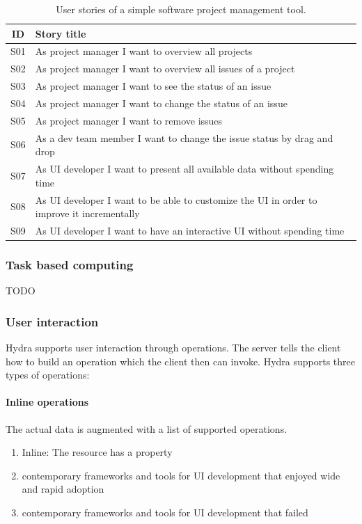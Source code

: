 \begin{table}
  \begin{center}
    \begin{tabular}{ |c|l| }
      \hline
      ID & Story title \\
      \hline
      S01 & As project manager I want to overview all projects \\
      S02 & As project manager I want to overview all issues of a project \\
      S03 & As project manager I want to see the status of an issue \\
      S04 & As project manager I want to change the status of an issue \\
      S05 & As project manager I want to remove issues \\
      S06 & As a dev team member I want to change the issue status by drag and drop \\
      S07 & As UI developer I want to present all available data without spending time \\
      S08 & As UI developer I want to be able to customize the UI in order to improve it incrementally \\
      S09 & As UI developer I want to have an interactive UI without spending time \\
      \hline
    \end{tabular}
    \caption{User stories of a simple software project management tool.}
  \end{center}
\end{table}

\subsubsection{Task based computing}

TODO

\subsubsection{User interaction}
Hydra supports user interaction through operations. The server tells the client how to build an operation which the client then can invoke. Hydra supports three types of operations:

\paragraph{Inline operations}
The actual data is augmented with a list of supported operations.
\begin{enumerate}
  \item Inline: The resource has a property
  \item contemporary frameworks and tools for UI development that enjoyed wide and rapid adoption
  \item contemporary frameworks and tools for UI development that failed
\end{enumerate}

